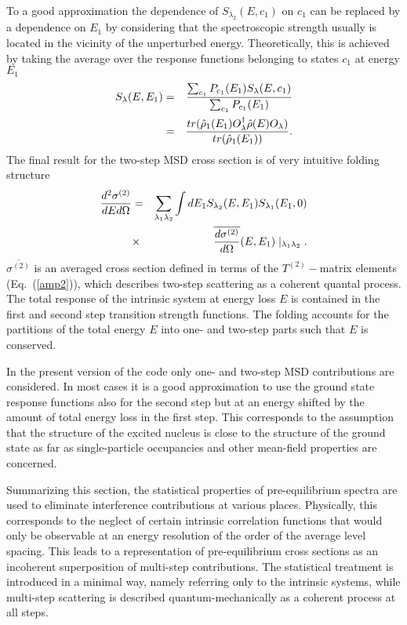 To a good approximation the dependence of $S_{\lambda_{2}}(E,c_{1})$ on $%
c_{1}$ can be replaced by a dependence on $E_{1}$ by considering that the
spectroscopic strength usually is located in the vicinity of the unperturbed
energy. Theoretically, this is achieved by taking the average over the
response functions belonging to states $c_{1}$ at energy $E_{1}$
\begin{eqnarray}
S_{\lambda}(E,E_{1}) & = & \frac{\sum_{c_{1}}{P_{c_{1}}(E_{1})S_{%
\lambda}(E,c_{1})}}{\sum_{c_{1}}{P_{c_{1}}(E_{1})}}  \notag \\
& = & \frac{tr(\hat{\rho}_{1}(E_{1})O_{\lambda}^{\dag}\hat{\rho}%
(E)O_{\lambda})}{tr(\hat{\rho}_{1}(E_{1}))}.  \label{slave}
\end{eqnarray}
\noindent The final result for the two-step MSD%
 cross section is of very intuitive folding structure
\begin{eqnarray}
\frac{d^{2}\sigma^{(2)}}{dEd\Omega} & = & \sum_{\lambda_{1}\lambda_{2}}
  {\int dE_{1} S_{\lambda_{2}}(E,E_{1})S_{\lambda_{1}}(E_{1},0)} \notag \\
& \times & \overline{\frac{d\sigma^{(2)}}{d\Omega}}(E,E_{1})
  \mid_{\lambda_{1}\lambda_{2}}.
\label{sigma2}
\end{eqnarray}
\noindent $\overline{\sigma^{(2)}}$ is an averaged cross section defined in
terms of the $T^{(2)}-$matrix elements (Eq.~(\ref{amp2})), which describes
two-step scattering as a coherent quantal process. The
total response of the intrinsic system at energy loss $E$ is contained in
the first and second step transition strength functions. The folding
accounts for the partitions of the total energy $E$ into one- and two-step
parts such that $E$ is conserved.

In the present version of the code only one- and two-step MSD%
 contributions are considered. In most cases it is a good
approximation to use the ground state response functions also for the second
step but at an energy shifted by the amount of total energy loss in the
first step. This corresponds to the assumption that the structure of the
excited nucleus is close to the structure of the ground state as far as
single-particle occupancies and other mean-field properties are concerned.

Summarizing this section, the statistical properties of pre-equilibrium
spectra are used to eliminate interference contributions at various places.
Physically, this corresponds to the neglect of certain intrinsic correlation
functions that would only be observable at an energy resolution of the
order of the average level spacing. This leads to a representation of
pre-equilibrium cross sections as an incoherent super\-position of multi-step
contributions. The statistical treatment is introduced in a minimal way,
namely referring only to the intrinsic systems, while multi-step scattering
is described quantum-mechanically as a coherent process at all steps.

